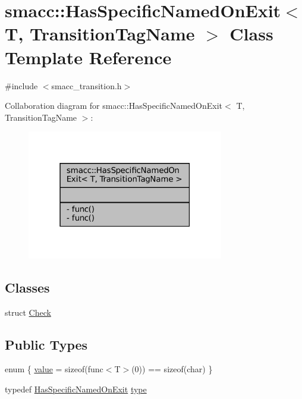 \hypertarget{classsmacc_1_1HasSpecificNamedOnExit}{}\section{smacc\+:\+:Has\+Specific\+Named\+On\+Exit$<$ T, Transition\+Tag\+Name $>$ Class Template Reference}
\label{classsmacc_1_1HasSpecificNamedOnExit}


{\ttfamily \#include $<$smacc\+\_\+transition.\+h$>$}



Collaboration diagram for smacc\+:\+:Has\+Specific\+Named\+On\+Exit$<$ T, Transition\+Tag\+Name $>$\+:
\nopagebreak
\begin{figure}[H]
\begin{center}
\leavevmode
\includegraphics[width=243pt]{classsmacc_1_1HasSpecificNamedOnExit__coll__graph}
\end{center}
\end{figure}
\subsection*{Classes}
\begin{DoxyCompactItemize}
\item 
struct \hyperlink{structsmacc_1_1HasSpecificNamedOnExit_1_1Check}{Check}
\end{DoxyCompactItemize}
\subsection*{Public Types}
\begin{DoxyCompactItemize}
\item 
enum \{ \hyperlink{classsmacc_1_1HasSpecificNamedOnExit_aff1a587a8d216597d2dd5b208affc8d0a37b1f8de55f442fbc24c211bacfcccf7}{value} = sizeof(func$<$T$>$(0)) == sizeof(char)
 \}
\item 
typedef \hyperlink{classsmacc_1_1HasSpecificNamedOnExit}{Has\+Specific\+Named\+On\+Exit} \hyperlink{classsmacc_1_1HasSpecificNamedOnExit_a79c051b3a86d6a6c05d4c3420d7147ff}{type}
\end{DoxyCompactItemize}

